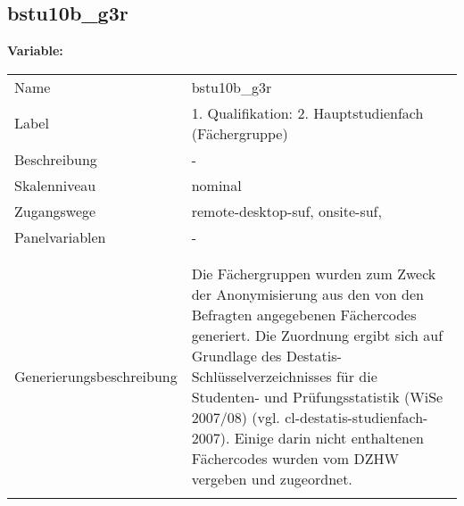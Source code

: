 	
	
	\subsection{bstu10b\_g3r}
	\label{subSection:bstu10b_g3r}

	\noindent\textbf{Variable:}\\
		\begin{tabular}{lL{11.3cm}}
			\label{tableVariable:bstu10b_g3r}
			Name & bstu10b\_g3r \\
			Label & 1. Qualifikation: 2. Hauptstudienfach (Fächergruppe) \\
			Beschreibung & - \\
			Skalenniveau & nominal \\
			Zugangswege &
				remote-desktop-suf,
				onsite-suf,
 \\
			Panelvariablen & -
			 \\
			 \\
 \\
					Generierungsbeschreibung & Die Fächergruppen wurden zum Zweck der Anonymisierung aus den von den Befragten angegebenen Fächercodes generiert. Die Zuordnung ergibt sich auf Grundlage des Destatis-Schlüsselverzeichnisses für die Studenten- und Prüfungsstatistik (WiSe 2007/08) (vgl. cl-destatis-studienfach-2007). Einige darin nicht enthaltenen Fächercodes wurden vom DZHW vergeben und zugeordnet. 
				 \\	
			 \\
		\end{tabular}






